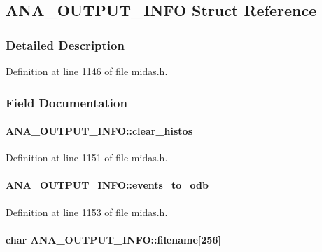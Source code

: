 \subsection{ANA\_\-OUTPUT\_\-INFO Struct Reference}
\label{structANA__OUTPUT__INFO}


\subsubsection{Detailed Description}


Definition at line 1146 of file midas.h.

\subsubsection{Field Documentation}
\paragraph[{clear\_\-histos}]{ {\bf ANA\_\-OUTPUT\_\-INFO::clear\_\-histos}}\hfill\label{structANA__OUTPUT__INFO_a8323f39abba97aeefe2d19cb8a51cfd5}


Definition at line 1151 of file midas.h.
\paragraph[{events\_\-to\_\-odb}]{ {\bf ANA\_\-OUTPUT\_\-INFO::events\_\-to\_\-odb}}\hfill\label{structANA__OUTPUT__INFO_aa5907f3853b13317a299764560957678}


Definition at line 1153 of file midas.h.
\paragraph[{filename}]{\setlength{\rightskip}{0pt plus 5cm}char {\bf ANA\_\-OUTPUT\_\-INFO::filename}\mbox{[}256\mbox{]}}\hfill\label{structANA__OUTPUT__INFO_ae1b40165b0a917678463bc764cc84992}



